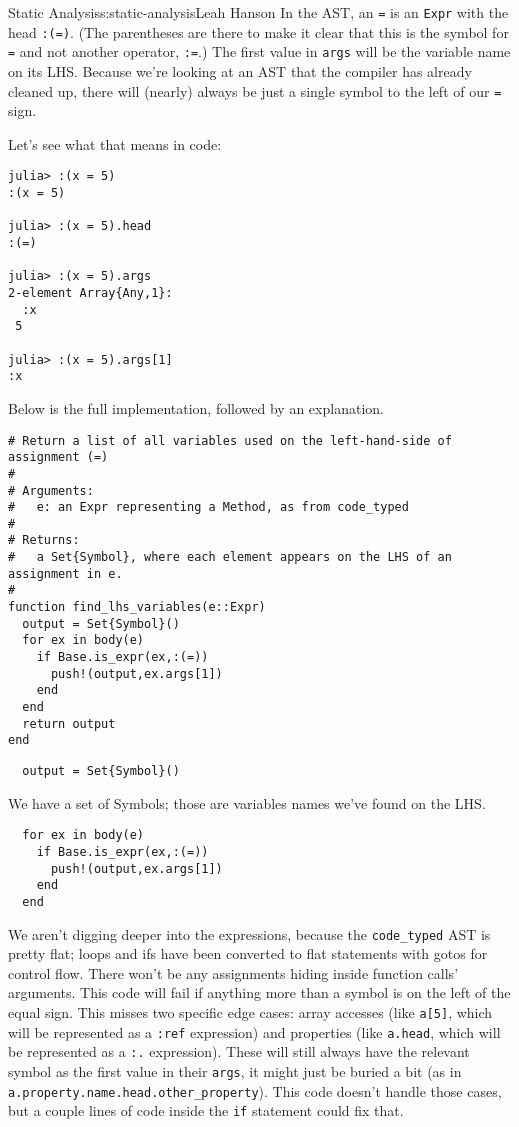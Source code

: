 \begin{aosachapter}{Static Analysis}{s:static-analysis}{Leah Hanson}
In the AST, an \texttt{=} is an \texttt{Expr} with the head
\texttt{:(=)}. (The parentheses are there to make it clear that this is
the symbol for \texttt{=} and not another operator, \texttt{:=}.) The
first value in \texttt{args} will be the variable name on its LHS.
Because we're looking at an AST that the compiler has already cleaned
up, there will (nearly) always be just a single symbol to the left of
our \texttt{=} sign.

Let's see what that means in code:

\begin{verbatim}
julia> :(x = 5)
:(x = 5)

julia> :(x = 5).head
:(=)

julia> :(x = 5).args
2-element Array{Any,1}:
  :x
 5  

julia> :(x = 5).args[1]
:x
\end{verbatim}

Below is the full implementation, followed by an explanation.

\begin{verbatim}
# Return a list of all variables used on the left-hand-side of assignment (=)
#
# Arguments:
#   e: an Expr representing a Method, as from code_typed
#
# Returns:
#   a Set{Symbol}, where each element appears on the LHS of an assignment in e.
#
function find_lhs_variables(e::Expr)
  output = Set{Symbol}()
  for ex in body(e)
    if Base.is_expr(ex,:(=))
      push!(output,ex.args[1])
    end
  end
  return output
end
\end{verbatim}

\begin{verbatim}
  output = Set{Symbol}()
\end{verbatim}

We have a set of Symbols; those are variables names we've found on the
LHS.

\begin{verbatim}
  for ex in body(e)
    if Base.is_expr(ex,:(=))
      push!(output,ex.args[1])
    end
  end
\end{verbatim}

We aren't digging deeper into the expressions, because the
\texttt{code\_typed} AST is pretty flat; loops and ifs have been
converted to flat statements with gotos for control flow. There won't be
any assignments hiding inside function calls' arguments. This code will
fail if anything more than a symbol is on the left of the equal sign.
This misses two specific edge cases: array accesses (like
\texttt{a{[}5{]}}, which will be represented as a \texttt{:ref}
expression) and properties (like \texttt{a.head}, which will be
represented as a \texttt{:.} expression). These will still always have
the relevant symbol as the first value in their \texttt{args}, it might
just be buried a bit (as in
\texttt{a.property.name.head.other\_property}). This code doesn't handle
those cases, but a couple lines of code inside the \texttt{if} statement
could fix that.


\end{aosachapter}
